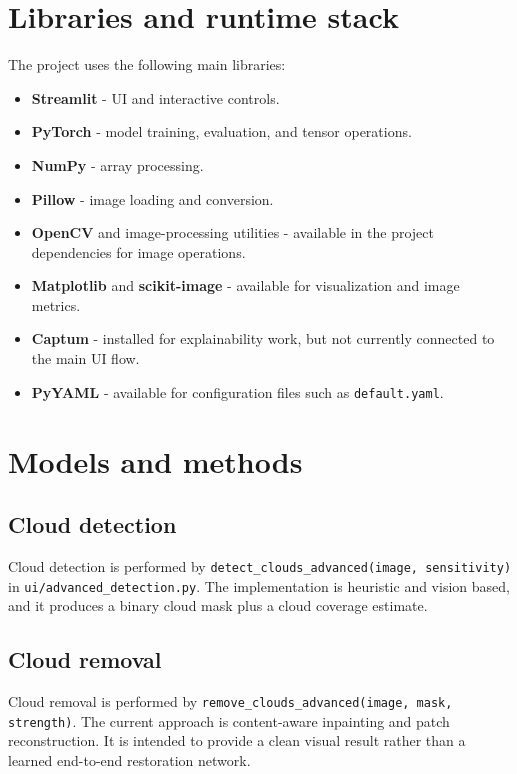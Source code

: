 \documentclass[11pt,a4paper]{article}
\begin{document}
\section{Libraries and runtime stack}
The project uses the following main libraries:
\begin{itemize}
  \item \textbf{Streamlit} - UI and interactive controls.
  \item \textbf{PyTorch} - model training, evaluation, and tensor operations.
  \item \textbf{NumPy} - array processing.
  \item \textbf{Pillow} - image loading and conversion.
  \item \textbf{OpenCV} and image-processing utilities - available in the project dependencies for image operations.
  \item \textbf{Matplotlib} and \textbf{scikit-image} - available for visualization and image metrics.
  \item \textbf{Captum} - installed for explainability work, but not currently connected to the main UI flow.
  \item \textbf{PyYAML} - available for configuration files such as \verb|default.yaml|.
\end{itemize}

\section{Models and methods}
\subsection{Cloud detection}
Cloud detection is performed by \verb|detect_clouds_advanced(image, sensitivity)| in \verb|ui/advanced_detection.py|. The implementation is heuristic and vision based, and it produces a binary cloud mask plus a cloud coverage estimate.

\subsection{Cloud removal}
Cloud removal is performed by \verb|remove_clouds_advanced(image, mask, strength)|. The current approach is content-aware inpainting and patch reconstruction. It is intended to provide a clean visual result rather than a learned end-to-end restoration network.
\end{document}
